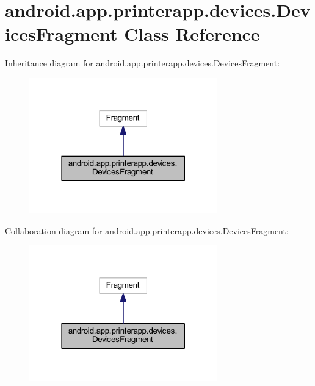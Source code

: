 \hypertarget{classandroid_1_1app_1_1printerapp_1_1devices_1_1_devices_fragment}{}\section{android.\+app.\+printerapp.\+devices.\+Devices\+Fragment Class Reference}
\label{classandroid_1_1app_1_1printerapp_1_1devices_1_1_devices_fragment}


Inheritance diagram for android.\+app.\+printerapp.\+devices.\+Devices\+Fragment\+:
\nopagebreak
\begin{figure}[H]
\begin{center}
\leavevmode
\includegraphics[width=231pt]{classandroid_1_1app_1_1printerapp_1_1devices_1_1_devices_fragment__inherit__graph}
\end{center}
\end{figure}


Collaboration diagram for android.\+app.\+printerapp.\+devices.\+Devices\+Fragment\+:
\nopagebreak
\begin{figure}[H]
\begin{center}
\leavevmode
\includegraphics[width=231pt]{classandroid_1_1app_1_1printerapp_1_1devices_1_1_devices_fragment__coll__graph}
\end{center}
\end{figure}
